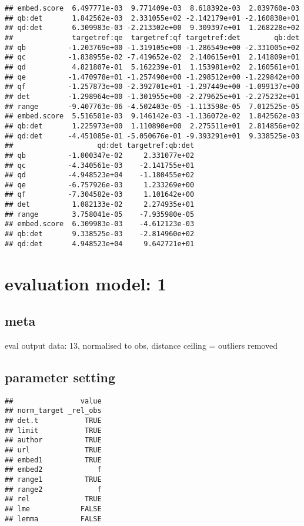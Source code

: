 \documentclass[
  12pt,
  oneside]{book}
\begin{document}
\begin{verbatim}
## embed.score  6.497771e-03  9.771409e-03  8.618392e-03  2.039760e-03
## qb:det       1.842562e-03  2.331055e+02 -2.142179e+01 -2.160838e+01
## qd:det       6.309983e-03 -2.213302e+00  9.309397e+01  1.268228e+02
##              targetref:qe  targetref:qf targetref:det        qb:det
## qb          -1.203769e+00 -1.319105e+00 -1.286549e+00 -2.331005e+02
## qc          -1.838955e-02 -7.419652e-02  2.140615e+01  2.141809e+01
## qd           4.821807e-01  5.162239e-01  1.153981e+02  2.160561e+01
## qe          -1.470978e+01 -1.257490e+00 -1.298512e+00 -1.229842e+00
## qf          -1.257873e+00 -2.392701e+01 -1.297449e+00 -1.099137e+00
## det         -1.298964e+00 -1.301955e+00 -2.279625e+01 -2.275232e+01
## range       -9.407763e-06 -4.502403e-05 -1.113598e-05  7.012525e-05
## embed.score  5.516501e-03  9.146142e-03 -1.136072e-02  1.842562e-03
## qb:det       1.225973e+00  1.110890e+00  2.275511e+01  2.814856e+02
## qd:det      -4.451085e-01 -5.050676e-01 -9.393291e+01  9.338525e-03
##                    qd:det targetref:qb:det
## qb          -1.000347e-02     2.331077e+02
## qc          -4.340561e-03    -2.141755e+01
## qd          -4.948523e+04    -1.180455e+02
## qe          -6.757926e-03     1.233269e+00
## qf          -7.304582e-03     1.101642e+00
## det          1.082133e-02     2.274935e+01
## range        3.758041e-05    -7.935980e-05
## embed.score  6.309983e-03    -4.612123e-03
## qb:det       9.338525e-03    -2.814960e+02
## qd:det       4.948523e+04     9.642721e+01
\end{verbatim}

\section{evaluation model: 1}\label{evaluation-model-1}

\subsection{meta}\label{meta}

eval output data: 13, normalised to obs, distance ceiling = outliers removed

\subsection{parameter setting}\label{parameter-setting}

\begin{verbatim}
##                value
## norm_target _rel_obs
## det.t           TRUE
## limit           TRUE
## author          TRUE
## url             TRUE
## embed1          TRUE
## embed2             f
## range1          TRUE
## range2             f
## rel             TRUE
## lme            FALSE
## lemma          FALSE
\end{verbatim}
\end{document}
